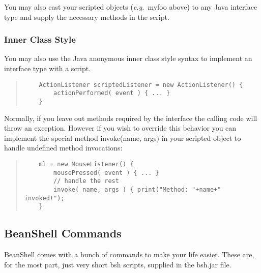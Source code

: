 \documentclass[twoside,11pt]{article}
\renewcommand{\_}{\texttt{\symbol{95}}}
\newcommand{\eg}{\textit{e.g.}}
\begin{document}
You may also cast your scripted objects (\eg\ myfoo above) to any Java
interface type and supply the necessary methods in the script.

\subsubsection{Inner Class Style}

You may also use the Java anonymous inner class style syntax to implement an
interface type with a script.
\begin{quote}
\begin{verbatim}
    ActionListener scriptedListener = new ActionListener() {
        actionPerformed( event ) { ... }
    }
\end{verbatim}
\end{quote}
Normally, if you leave out methods required by the interface the calling code
will throw an exception.  However if you wish to override this behavior
you can implement the special method invoke(name, args) in your scripted
object to handle undefined method invocations:
\begin{quote}
\begin{verbatim}
    ml = new MouseListener() {
        mousePressed( event ) { ... }
        // handle the rest
        invoke( name, args ) { print("Method: "+name+" invoked!");
    }
\end{verbatim}
\end{quote}

\subsection{BeanShell Commands}

BeanShell comes with a bunch of commands to make your life easier.
These are, for the most part, just very short bsh scripts, supplied in the
bsh.jar file.
\end{document}
